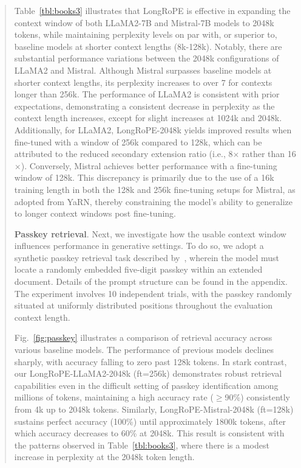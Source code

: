 \begin{abstract}
Table~\ref{tbl:books3} illustrates that LongRoPE is effective in expanding the context window of both LLaMA2-7B and Mistral-7B models to 2048k tokens, while maintaining perplexity levels on par with, or superior to, baseline models at shorter context lengths (8k-128k). Notably, there are substantial performance variations between the 2048k configurations of LLaMA2 and Mistral. Although Mistral surpasses baseline models at shorter context lengths, its perplexity increases to over 7 for contexts longer than 256k. The performance of LLaMA2 is consistent with prior expectations, demonstrating a consistent decrease in perplexity as the context length increases, except for slight increases at 1024k and 2048k. Additionally, for LLaMA2, LongRoPE-2048k yields improved results when fine-tuned with a window of 256k compared to 128k, which can be attributed to the reduced secondary extension ratio (i.e., 8$\times$ rather than 16$\times$). Conversely, Mistral achieves better performance with a fine-tuning window of 128k. This discrepancy is primarily due to the use of a 16k training length in both the 128k and 256k fine-tuning setups for Mistral, as adopted from YaRN, thereby constraining the model’s ability to generalize to longer context windows post fine-tuning.

\textbf{Passkey retrieval}. Next, we investigate how the usable context window influences performance in generative settings. To do so, we adopt a synthetic passkey retrieval task described by~\cite{passkey}, wherein the model must locate a randomly embedded five-digit passkey within an extended document. Details of the prompt structure can be found in the appendix. The experiment involves 10 independent trials, with the passkey randomly situated at uniformly distributed positions throughout the evaluation context length.

Fig.~\ref{fig:passkey} illustrates a comparison of retrieval accuracy across various baseline models. The performance of previous models declines sharply, with accuracy falling to zero past 128k tokens. In stark contrast, our LongRoPE-LLaMA2-2048k (ft=256k) demonstrates robust retrieval capabilities even in the difficult setting of passkey identification among millions of tokens, maintaining a high accuracy rate ($\ge$90\%) consistently from 4k up to 2048k tokens. Similarly, LongRoPE-Mistral-2048k (ft=128k) sustains perfect accuracy (100\%) until approximately 1800k tokens, after which accuracy decreases to 60\% at 2048k. This result is consistent with the patterns observed in Table~\ref{tbl:books3}, where there is a modest increase in perplexity at the 2048k token length.


\end{abstract}
